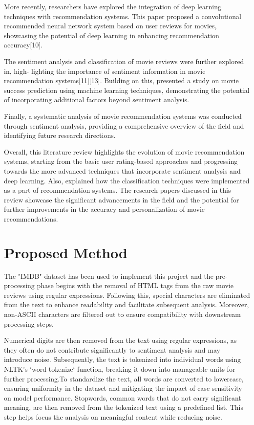 \documentclass[acmlarge,nonacm,12pt]{acmart}
\begin{document}
More recently, researchers have explored the integration of deep learning techniques with recommendation systems. This paper proposed a convolutional recommended neural network system based on user reviews for movies, showcasing the potential of deep learning in enhancing recommendation accuracy[10]. 

The sentiment analysis and classification of movie reviews were further explored in, high- lighting the importance of sentiment information in movie recommendation systems[11][13]. Building on this, presented a study on movie success prediction using machine learning techniques, demonstrating the potential of incorporating additional factors beyond sentiment analysis.

Finally, a systematic analysis of movie recommendation systems was conducted through sentiment analysis, providing a comprehensive overview of the field and identifying future research directions.


Overall, this literature review highlights the evolution of movie recommendation systems, starting from the basic user rating-based approaches and progressing towards the more advanced techniques that incorporate sentiment analysis and deep learning. Also, explained how the classification techniques were implemented as a part of recommendation systems. The research papers discussed in this review showcase the significant advancements in the field and the potential for further improvements in the accuracy and personalization of movie recommendations.

\section{Proposed Method}

The "IMDB" dataset has been used to implement this project and the pre-processing phase begins with the removal of HTML tags from the raw movie reviews using regular expressions. Following this, special characters are eliminated from the text to enhance readability and facilitate subsequent analysis. Moreover, non-ASCII characters are filtered out to ensure compatibility with downstream processing steps.

Numerical digits are then removed from the text using regular expressions, as they often do not contribute significantly to sentiment analysis and may introduce noise. Subsequently, the text is tokenized into individual words using NLTK's `word tokenize` function, breaking it down into manageable units for further processing.To standardize the text, all words are converted to lowercase, ensuring uniformity in the dataset and mitigating the impact of case sensitivity on model performance. Stopwords, common words that do not carry significant meaning, are then removed from the tokenized text using a predefined list. This step helps focus the analysis on meaningful content while reducing noise.
\end{document}
